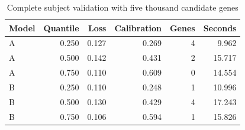 \begin{table}[t]
\caption{Complete subject validation with five thousand candidate genes}\label{tab:joint-prediction}
\centering\small
\begin{tabular}{lrrrrr}
\toprule
Model & Quantile & Loss & Calibration & Genes & Seconds \\
\midrule
A & 0.250 & 0.127 & 0.269 & 4 & 9.962 \\
A & 0.500 & 0.142 & 0.431 & 2 & 15.717 \\
A & 0.750 & 0.110 & 0.609 & 0 & 14.554 \\
B & 0.250 & 0.110 & 0.248 & 1 & 10.996 \\
B & 0.500 & 0.130 & 0.429 & 4 & 17.243 \\
B & 0.750 & 0.106 & 0.594 & 1 & 15.826 \\
\bottomrule
\end{tabular}
\end{table}
